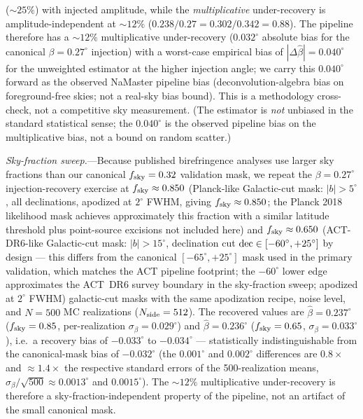 \documentclass[aps,prd,twocolumn,superscriptaddress,showpacs,preprintnumbers,nofootinbib,longbibliography,floatfix]{revtex4-2}
\begin{document}
($\sim\!25\%$) with injected
amplitude, while the \emph{multiplicative} under-recovery is
amplitude-independent at $\sim\!12\%$
($0.238/0.27 = 0.302/0.342 = 0.88$). The pipeline therefore has a
${\sim}12\%$ multiplicative under-recovery ($0.032^\circ$ absolute bias for the
canonical $\beta=0.27^\circ$ injection) with a worst-case empirical bias of
$|\Delta\hat\beta| = 0.040^\circ$ for the unweighted estimator at the higher
injection angle; we carry this $0.040^\circ$ forward as the observed NaMaster
pipeline bias (deconvolution-algebra bias on foreground-free skies; not a real-sky bias bound). This is a methodology cross-check, not a competitive
sky measurement.  (The estimator is \emph{not} unbiased in the standard
statistical sense; the $0.040^\circ$ is the observed pipeline bias on the
multiplicative bias, not a bound on random scatter.)

\textit{Sky-fraction sweep.}---Because published birefringence analyses use
larger sky fractions than our canonical $f_{\rm sky}=0.32$ validation mask, we
repeat the $\beta=0.27^\circ$ injection-recovery exercise at
$f_{\rm sky}\approx 0.850$ (Planck-like Galactic-cut mask: $|b|>5^\circ$,
all declinations, apodized at $2^\circ$ FWHM, giving $f_{\rm sky}\approx 0.850$;
the Planck 2018 likelihood mask achieves approximately this fraction
with a similar latitude threshold plus point-source excisions not included here)
and $f_{\rm sky}\approx 0.650$ (ACT-DR6-like Galactic-cut mask: $|b|>15^\circ$,
declination cut ${\rm dec}\in[-60^\circ,+25^\circ]$ by design --- this differs from
the canonical $[-65^\circ,+25^\circ]$ mask used in the primary validation, which
matches the ACT pipeline footprint; the $-60^\circ$ lower edge approximates the
ACT~DR6 survey boundary in the sky-fraction sweep; apodized at $2^\circ$ FWHM)
galactic-cut masks with the same apodization recipe, noise level, and
$N\!=\!500$ MC realizations ($N_{\rm side}=512$). The recovered values are
$\hat\beta=0.237^\circ$ ($f_{\rm sky}=0.85$, per-realization
$\sigma_\beta=0.029^\circ$) and $\hat\beta=0.236^\circ$ ($f_{\rm sky}=0.65$,
$\sigma_\beta=0.033^\circ$), i.e.\ a recovery bias of $-0.033^\circ$ to
$-0.034^\circ$ --- statistically indistinguishable from the canonical-mask
bias of $-0.032^\circ$ (the $0.001^\circ$ and $0.002^\circ$ differences are
$0.8\times$ and ${\approx}1.4\times$ the respective standard errors of the
500-realization means,
$\sigma_\beta/\sqrt{500} \approx 0.0013^\circ$ and $0.0015^\circ$).
The $\sim\!12\%$ multiplicative under-recovery is
therefore a sky-fraction-independent property of the pipeline,
not an artifact of the small canonical mask.
\end{document}
